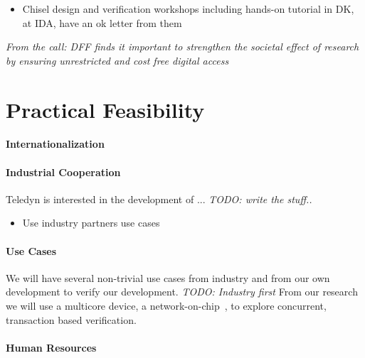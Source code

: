 \documentclass[fleqn,12pt]{article}
\newcommand{\todo}[1]{{\it TODO: #1}}
\begin{document}
\begin{itemize}
\item Chisel design and verification workshops including hands-on tutorial in DK, at IDA, have an ok letter from them
\end{itemize}


\emph{From the call: DFF finds it important to strengthen the societal effect of research by ensuring unrestricted and cost free digital access}



\section{Practical Feasibility}


\paragraph*{Internationalization}



\paragraph*{Industrial Cooperation}

Teledyn is interested in the development of ... \todo{write the stuff..}

\begin{itemize}
\item Use industry partners use cases
\end{itemize}


\paragraph*{Use Cases}

We will have several non-trivial use cases from industry and from our own development to verify
our development. \todo{Industry first}
From our research we will use a multicore device, a network-on-chip~\cite{s4noc:nocarc2019},
to explore concurrent, transaction based verification.

\paragraph*{Human Resources}
\end{document}
